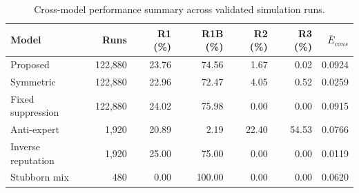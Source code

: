 \begin{table}[htbp]
  \centering
  \caption{Cross-model performance summary across validated simulation runs.}
  \label{tab:cross-model}
  \begin{tabular}{lrrrrrr}
    \toprule
    Model & Runs & R1 (\%) & R1B (\%) & R2 (\%) & R3 (\%) & $\bar{E}_{cons}$ \\
    \midrule
    Proposed & 122{,}880 & 23.76 & 74.56 & 1.67 & 0.02 & 0.0924 \\
    Symmetric & 122{,}880 & 22.96 & 72.47 & 4.05 & 0.52 & 0.0259 \\
    Fixed suppression & 122{,}880 & 24.02 & 75.98 & 0.00 & 0.00 & 0.0915 \\
    Anti-expert & 1{,}920 & 20.89 & 2.19 & 22.40 & 54.53 & 0.0766 \\
    Inverse reputation & 1{,}920 & 25.00 & 75.00 & 0.00 & 0.00 & 0.0119 \\
    Stubborn mix & 480 & 0.00 & 100.00 & 0.00 & 0.00 & 0.0620 \\
    \bottomrule
  \end{tabular}
\end{table}

